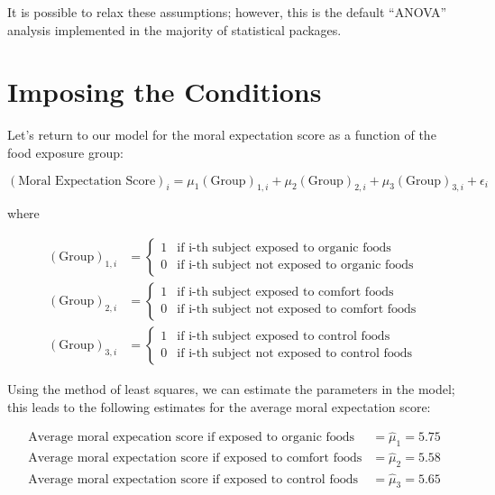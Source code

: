 \documentclass[]{book}
\theoremstyle{plain}
\theoremstyle{mydefn}
\theoremstyle{myexmpl}
\theoremstyle{remark}
\begin{document}
It is possible to relax these assumptions; however, this is the default
``ANOVA'' analysis implemented in the majority of statistical packages.

\section{Imposing the Conditions}\label{imposing-the-conditions-1}

Let's return to our model for the moral expectation score as a function
of the food exposure group:

\[(\text{Moral Expectation Score})_i = \mu_1 (\text{Group})_{1,i} + \mu_2 (\text{Group})_{2,i} + \mu_3 (\text{Group})_{3,i} + \epsilon_i\]

where

\[
\begin{aligned}
  (\text{Group})_{1,i} &= \begin{cases}
    1 & \text{if i-th subject exposed to organic foods} \\
    0 & \text{if i-th subject not exposed to organic foods} 
    \end{cases} \\
  (\text{Group})_{2,i} &= \begin{cases}
    1 & \text{if i-th subject exposed to comfort foods} \\
    0 & \text{if i-th subject not exposed to comfort foods} 
    \end{cases} \\
  (\text{Group})_{3,i} &= \begin{cases}
    1 & \text{if i-th subject exposed to control foods} \\
    0 & \text{if i-th subject not exposed to control foods}
    \end{cases}
\end{aligned}
\]

Using the method of least squares, we can estimate the parameters in the
model; this leads to the following estimates for the average moral
expectation score:

\[
\begin{aligned}
  \text{Average moral expecation score if exposed to organic foods} &= \widehat{\mu}_1 = 5.75 \\
  \text{Average moral expectation score if exposed to comfort foods} &= \widehat{\mu}_2 = 5.58 \\
  \text{Average moral expectation score if exposed to control foods} &= \widehat{\mu}_3 = 5.65
\end{aligned}
\]
\end{document}
